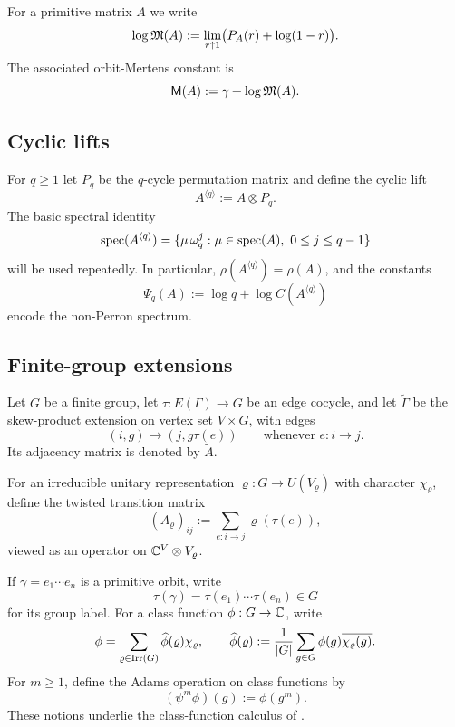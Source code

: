 \begin{definition}\label{def:abel-finite-part}
For a primitive matrix \(A\) we write
\[
  \log\mathfrak{M}(A):=\lim_{r\uparrow 1}\bigl(P_A(r)+\log(1-r)\bigr).
\]
The associated orbit-Mertens constant is
\[
  \mathsf M(A):=\gamma+\log\mathfrak{M}(A).
\]
\end{definition}

\subsection{Cyclic lifts}

For \(q\ge 1\) let \(P_q\) be the \(q\)-cycle permutation matrix and
define the cyclic lift
\begin{equation}\label{eq:cyclic-lift-def}
  A^{\langle q\rangle}:=A\otimes P_q.
\end{equation}
The basic spectral identity
\[
  \operatorname{spec}(A^{\langle q\rangle})
  =\{\mu\,\omega_q^j:\mu\in\operatorname{spec}(A),\ 0\le j\le q-1\}
\]
will be used repeatedly. In particular,
\(\rho(A^{\langle q\rangle})=\rho(A)\), and the constants
\[
  \Psi_q(A):=\log q+\log C(A^{\langle q\rangle})
\]
encode the non-Perron spectrum.

\subsection{Finite-group extensions}

Let \(G\) be a finite group, let \(\tau:E(\Gamma)\to G\) be an edge
cocycle, and let \(\widetilde\Gamma\) be the skew-product extension on
vertex set \(V\times G\), with edges
\[
  (i,g)\longrightarrow (j,g\tau(e))
  \qquad \text{whenever } e:i\to j.
\]
Its adjacency matrix is denoted by \(\widetilde A\).

For an irreducible unitary representation
\(\varrho:G\to U(V_\varrho)\) with character \(\chi_\varrho\), define
the twisted transition matrix
\begin{equation}\label{eq:twisted-matrix-def}
  (A_\varrho)_{ij}:=\sum_{e:i\to j}\varrho(\tau(e)),
\end{equation}
viewed as an operator on \(\mathbb{C}^V\otimes V_\varrho\).

If \(\gamma=e_1\cdots e_n\) is a primitive orbit, write
\[
  \tau(\gamma)=\tau(e_1)\cdots\tau(e_n)\in G
\]
for its group label. For a class function \(\phi:G\to\mathbb{C}\), write
\begin{equation}\label{eq:class-function-fourier}
  \phi
  =\sum_{\varrho\in\operatorname{Irr}(G)}\widehat\phi(\varrho)\chi_\varrho,
  \qquad
  \widehat\phi(\varrho)
  :=\frac{1}{|G|}\sum_{g\in G}\phi(g)\overline{\chi_\varrho(g)}.
\end{equation}
For \(m\ge 1\), define the Adams operation on class functions by
\begin{equation}\label{eq:adams-class-function}
  (\psi^m\phi)(g):=\phi(g^m).
\end{equation}
These notions underlie the class-function calculus of
.

